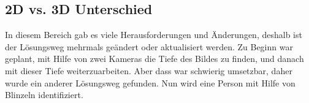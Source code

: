 \subsection{2D vs. 3D Unterschied}
In diesem Bereich gab es viele Herausforderungen und Änderungen, deshalb ist der Lösungsweg mehrmals geändert oder aktualisiert werden. Zu Beginn war geplant, mit Hilfe von zwei Kameras die Tiefe des Bildes zu finden, und danach mit dieser Tiefe weiterzuarbeiten. Aber dass war schwierig umsetzbar, daher wurde ein anderer Lösungsweg gefunden. Nun wird eine Person mit Hilfe von  Blinzeln identifiziert.


